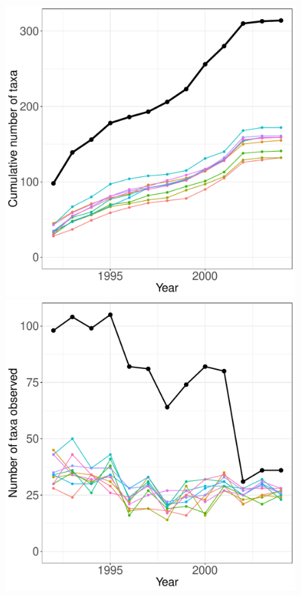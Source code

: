 \documentclass[11pt, oneside]{article}
\begin{document}
\begin{figure}[h!]
\centering
\includegraphics[scale = 0.4]{sev-arthropods-compagnoni_species_accumulation_curve.pdf}
\includegraphics[scale = 0.4]{sev-arthropods-compagnoni_num_taxa_over_time.pdf}

\end{figure}
\end{document}
